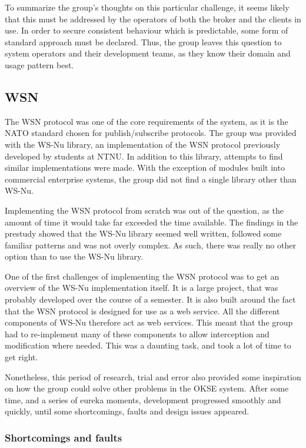 To summarize the group's thoughts on this particular challenge, it seems likely that this must be addressed by the operators of both the broker and the clients in use. In order to secure consistent behaviour which is predictable, some form of standard approach must be declared. Thus, the group leaves this question to system operators and their development teams, as they know their domain and usage pattern best.

\subsection{WSN}
\label{subsec:evaluation-implementation-wsn}

The WSN protocol was one of the core requirements of the system, as it is the NATO standard chosen for publish/subscribe protocols. The group was provided with the WS-Nu library, an implementation of the WSN protocol previously developed by students at NTNU. In addition to this library, attempts to find similar implementations were made. With the exception of modules built into commercial enterprise systems, the group did not find a single library other than WS-Nu.

Implementing the WSN protocol from scratch was out of the question, as the amount of time it would take far exceeded the time available. The findings in the prestudy showed that the WS-Nu library seemed well written, followed some familiar patterns and was not overly complex. As such, there was really no other option than to use the WS-Nu library.

One of the first challenges of implementing the WSN protocol was to get an overview of the WS-Nu implementation itself. It is a large project, that was probably developed over the course of a semester. It is also built around the fact that the WSN protocol is designed for use as a web service. All the different components of WS-Nu therefore act as web services. This meant that the group had to re-implement many of these components to allow interception and modification where needed. This was a daunting task, and took a lot of time to get right.

Nonetheless, this period of research, trial and error also provided some inspiration on how the group could solve other problems in the OKSE system. After some time, and a series of eureka moments, development progressed smoothly and quickly, until some shortcomings, faults and design issues appeared.

\subsubsection{Shortcomings and faults}
\label{subsec:evaluation-implementation-wsn-shortcomings_and_faults}


